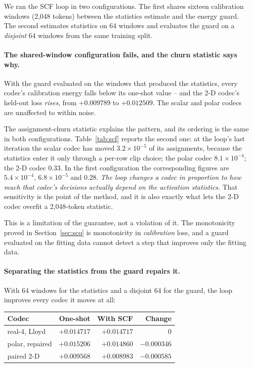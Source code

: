 We ran the SCF loop in two configurations. The first shares sixteen calibration
windows (2{,}048 tokens) between the statistics estimate and the energy guard.
The second estimates statistics on 64 windows and evaluates the guard on a
\emph{disjoint} 64 windows from the same training split.

\paragraph{The shared-window configuration fails, and the churn statistic says
why.} With the guard evaluated on the windows that produced the statistics,
every codec's calibration energy falls below its one-shot value -- and the 2-D
codec's held-out loss \emph{rises}, from $+0.009789$ to $+0.012509$. The scalar
and polar codecs are unaffected to within noise.

The assignment-churn statistic explains the pattern, and its ordering is the
same in both configurations. Table~\ref{tab:scf} reports the second one: at the
loop's last iteration the scalar codec has moved $3.2\times10^{-5}$ of its
assignments, because the statistics enter it only through a per-row clip choice;
the polar codec $8.1\times10^{-4}$; the 2-D codec $0.33$. In the first
configuration the corresponding figures are $5.4\times10^{-4}$,
$6.8\times10^{-5}$ and $0.28$. \emph{The loop changes a codec in
proportion to how much that codec's decisions actually depend on the activation
statistics.} That sensitivity is the point of the method, and it is also exactly
what lets the 2-D codec overfit a 2{,}048-token statistic.

This is a limitation of the guarantee, not a violation of it. The monotonicity
proved in Section~\ref{sec:scq} is monotonicity in \emph{calibration} loss, and
a guard evaluated on the fitting data cannot detect a step that improves only
the fitting data.

\paragraph{Separating the statistics from the guard repairs it.} With 64
windows for the statistics and a disjoint 64 for the guard, the loop improves
every codec it moves at all:

\begin{center}\small
\begin{tabular}{lrrr}\toprule
Codec & One-shot & With SCF & Change\\\midrule
real-4, Lloyd & $+0.014717$ & $+0.014717$ & $0$\\
polar, repaired & $+0.015206$ & $+0.014860$ & $-0.000346$\\
paired 2-D & $+0.009568$ & $\mathbf{+0.008983}$ & $-0.000585$\\\bottomrule
\end{tabular}
\end{center}

